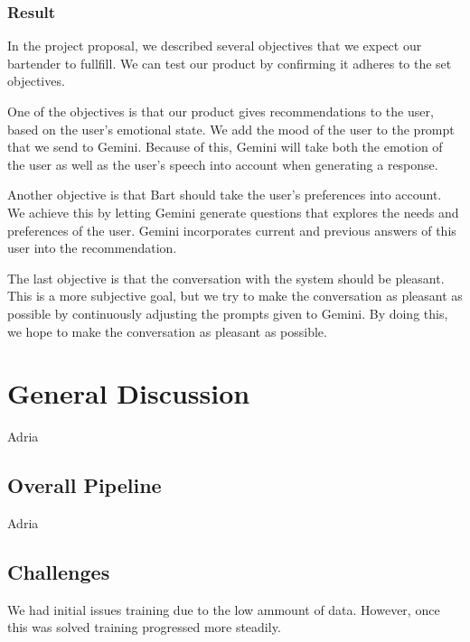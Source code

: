 \documentclass[conference]{IEEEtran}
\begin{document}
\subsubsection{Result}
In the project proposal, we described several objectives that we expect our bartender to fullfill.
We can test our product by confirming it adheres to the set objectives.

One of the objectives is that our product gives recommendations to the user, based on the user's emotional state.
We add the mood of the user to the prompt that we send to Gemini.
Because of this, Gemini will take both the emotion of the user as well as the user's speech into account when generating a response.

Another objective is that Bart should take the user's preferences into account. 
We achieve this by letting Gemini generate questions that explores the needs and preferences of the user.
Gemini incorporates current and previous answers of this user into the recommendation.

The last objective is that the conversation with the system should be pleasant.
This is a more subjective goal, but we try to make the conversation as pleasant as possible by continuously adjusting the prompts given to Gemini.
By doing this, we hope to make the conversation as pleasant as possible.


\section{General Discussion}
Adria\\

\subsection{Overall Pipeline}
Adria
\subsection{Challenges}
We had initial issues training due to the low ammount of data. However, once this was solved training progressed more steadily.
\end{document}
